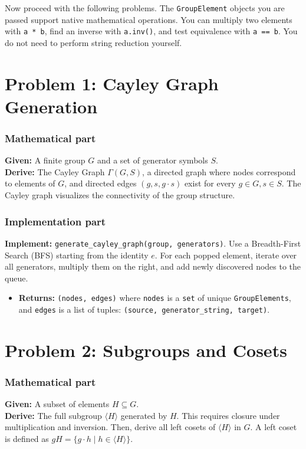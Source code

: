 \documentclass[11pt]{article}
\begin{document}
Now proceed with the following problems. The \lstinline|GroupElement| objects you are passed support native mathematical operations. You can multiply two elements with \lstinline|a * b|, find an inverse with \lstinline|a.inv()|, and test equivalence with \lstinline|a == b|. You do not need to perform string reduction yourself.

\section*{Problem 1: Cayley Graph Generation}

\subsubsection*{Mathematical part}
\textbf{Given:} A finite group $G$ and a set of generator symbols $S$. \\
\textbf{Derive:} The Cayley Graph $\Gamma(G, S)$, a directed graph where nodes correspond to elements of $G$, and directed edges $(g, s, g \cdot s)$ exist for every $g \in G, s \in S$. The Cayley graph visualizes the connectivity of the group structure.

\subsubsection*{Implementation part}
\textbf{Implement:} \lstinline|generate_cayley_graph(group, generators)|. Use a Breadth-First Search (BFS) starting from the identity $e$. For each popped element, iterate over all generators, multiply them on the right, and add newly discovered nodes to the queue.
\begin{itemize}
    \item \textbf{Returns:} \lstinline|(nodes, edges)| where \lstinline|nodes| is a \lstinline|set| of unique \lstinline|GroupElements|, and \lstinline|edges| is a list of tuples: \lstinline|(source, generator_string, target)|.
\end{itemize}

\section*{Problem 2: Subgroups and Cosets}

\subsubsection*{Mathematical part}
\textbf{Given:} A subset of elements $H \subseteq G$. \\
\textbf{Derive:} The full subgroup $\langle H \rangle$ generated by $H$. This requires closure under multiplication and inversion. Then, derive all left cosets of $\langle H \rangle$ in $G$. A left coset is defined as $gH = \{g \cdot h \mid h \in \langle H \rangle \}$.
\end{document}
